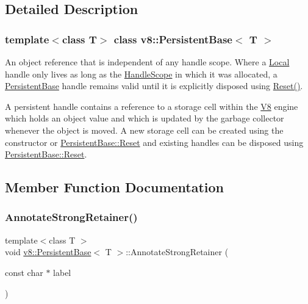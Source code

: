 \subsection{Detailed Description}
\subsubsection*{template$<$class T$>$\newline
class v8\+::\+Persistent\+Base$<$ T $>$}

An object reference that is independent of any handle scope. Where a \mbox{\hyperlink{classv8_1_1Local}{Local}} handle only lives as long as the \mbox{\hyperlink{classv8_1_1HandleScope}{Handle\+Scope}} in which it was allocated, a \mbox{\hyperlink{classv8_1_1PersistentBase}{Persistent\+Base}} handle remains valid until it is explicitly disposed using \mbox{\hyperlink{classv8_1_1PersistentBase_a174bb1e45b18fd4eeaee033622825bb8}{Reset()}}.

A persistent handle contains a reference to a storage cell within the \mbox{\hyperlink{classv8_1_1V8}{V8}} engine which holds an object value and which is updated by the garbage collector whenever the object is moved. A new storage cell can be created using the constructor or \mbox{\hyperlink{classv8_1_1PersistentBase_a174bb1e45b18fd4eeaee033622825bb8}{Persistent\+Base\+::\+Reset}} and existing handles can be disposed using \mbox{\hyperlink{classv8_1_1PersistentBase_a174bb1e45b18fd4eeaee033622825bb8}{Persistent\+Base\+::\+Reset}}. 

\subsection{Member Function Documentation}
\mbox{\label{classv8_1_1PersistentBase_a27ddb6118b13225207e9641c1e6c8c91}} 
\subsubsection{\texorpdfstring{Annotate\+Strong\+Retainer()}{AnnotateStrongRetainer()}}
{\footnotesize\ttfamily template$<$class T $>$ \\
void \mbox{\hyperlink{classv8_1_1PersistentBase}{v8\+::\+Persistent\+Base}}$<$ T $>$\+::Annotate\+Strong\+Retainer (\begin{DoxyParamCaption}\item[{const char $\ast$}]{label }\end{DoxyParamCaption})}

